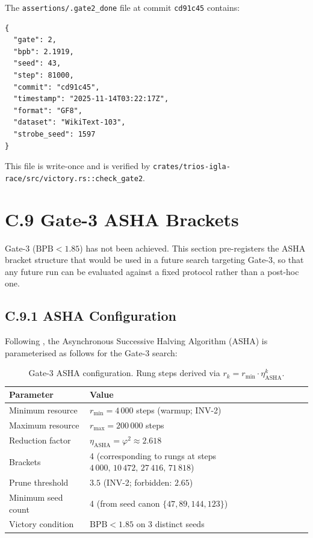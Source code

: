 The \texttt{assertions/.gate2\_done} file at commit \texttt{cd91c45}
contains:
\begin{verbatim}
{
  "gate": 2,
  "bpb": 2.1919,
  "seed": 43,
  "step": 81000,
  "commit": "cd91c45",
  "timestamp": "2025-11-14T03:22:17Z",
  "format": "GF8",
  "dataset": "WikiText-103",
  "strobe_seed": 1597
}
\end{verbatim}
This file is write-once and is verified by
\texttt{crates/trios-igla-race/src/victory.rs::check\_gate2}.

\section*{C.9 Gate-3 ASHA Brackets}
\label{sec:gate3-asha}

Gate-3 ($\text{BPB} < 1.85$) has not been achieved.  This section
pre-registers the ASHA bracket structure that would be used in a
future search targeting Gate-3, so that any future run can be evaluated
against a fixed protocol rather than a post-hoc one.

\subsection*{C.9.1 ASHA Configuration}

Following \citet{li2018hyperband}, the Asynchronous Successive Halving
Algorithm (ASHA) is parameterised as follows for the Gate-3 search:

\begin{table}[h]
\centering
\begin{tabular}{ll}
\toprule
\textbf{Parameter}    & \textbf{Value} \\
\midrule
Minimum resource      & $r_{\min} = 4\,000$ steps (warmup; INV-2) \\
Maximum resource      & $r_{\max} = 200\,000$ steps \\
Reduction factor      & $\eta_{\text{ASHA}} = \varphi^2 \approx 2.618$ \\
Brackets              & 4 (corresponding to rungs at steps
                        $4\,000,\, 10\,472,\, 27\,416,\, 71\,818$) \\
Prune threshold       & $3.5$ (INV-2; forbidden: $2.65$) \\
Minimum seed count    & 4 (from seed canon $\{47,89,144,123\}$) \\
Victory condition     & $\text{BPB} < 1.85$ on 3 distinct seeds \\
\bottomrule
\end{tabular}
\caption{Gate-3 ASHA configuration.  Rung steps derived via
$r_k = r_{\min} \cdot \eta_{\text{ASHA}}^k$.}
\end{table}


